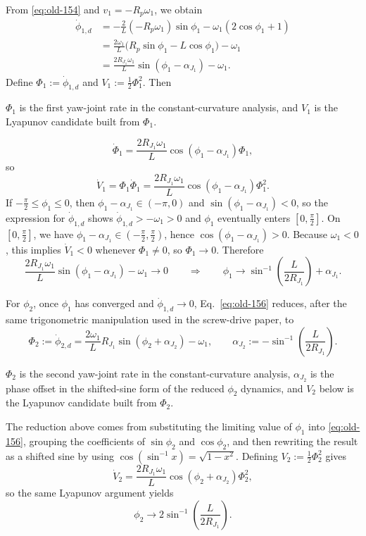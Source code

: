 \documentclass[12pt,a4paper]{report}
\newcommand{\newsymbols}[1]{\par\noindent{}#1\par\vspace{0.35em}}
\begin{document}
From \eqref{eq:old-154} and $v_1 = -R_p\omega_1$, we obtain
\begin{align}
\dot{\phi}_{1,d}
&=
-\frac{2}{L}(-R_p\omega_1)\sin\phi_1 - \omega_1(2\cos\phi_1 + 1) \\
&=
\frac{2\omega_1}{L}
\bigl(
R_p\sin\phi_1 - L\cos\phi_1
\bigr)
- \omega_1 \\
&=
\frac{2R_{J_1}\omega_1}{L}\sin(\phi_1 - \alpha_{J_1}) - \omega_1.
\end{align}
Define $\Phi_1 := \dot{\phi}_{1,d}$ and $V_1 := \frac{1}{2}\Phi_1^2$. Then
\newsymbols{$\Phi_1$ is the first yaw-joint rate in the constant-curvature analysis, and $V_1$ is the Lyapunov candidate built from $\Phi_1$.}
\begin{equation}
\dot{\Phi}_1 =
\frac{2R_{J_1}\omega_1}{L}\cos(\phi_1 - \alpha_{J_1})\Phi_1,
\end{equation}
so
\begin{equation}
\dot{V}_1
= \Phi_1 \dot{\Phi}_1
=
\frac{2R_{J_1}\omega_1}{L}
\cos(\phi_1 - \alpha_{J_1})\Phi_1^2.
\end{equation}
If $-\frac{\pi}{2} \le \phi_1 \le 0$, then $\phi_1 - \alpha_{J_1} \in (-\pi,0)$ and $\sin(\phi_1 - \alpha_{J_1}) < 0$, so the expression for $\dot{\phi}_{1,d}$ shows $\dot{\phi}_{1,d} > -\omega_1 > 0$ and $\phi_1$ eventually enters $[0,\frac{\pi}{2}]$. On $[0,\frac{\pi}{2}]$, we have $\phi_1 - \alpha_{J_1} \in (-\frac{\pi}{2},\frac{\pi}{2})$, hence $\cos(\phi_1 - \alpha_{J_1}) > 0$. Because $\omega_1 < 0$, this implies $\dot{V}_1 < 0$ whenever $\Phi_1 \neq 0$, so $\Phi_1 \to 0$. Therefore
\begin{equation}
\frac{2R_{J_1}\omega_1}{L}\sin(\phi_1 - \alpha_{J_1}) - \omega_1 \to 0
\qquad \Longrightarrow \qquad
\phi_1 \to \sin^{-1}\!\left(\frac{L}{2R_{J_1}}\right) + \alpha_{J_1}.
\end{equation}

For $\phi_2$, once $\phi_1$ has converged and $\dot{\phi}_{1,d} \to 0$, Eq.~\eqref{eq:old-156} reduces, after the same trigonometric manipulation used in the screw-drive paper, to
\begin{equation}
\Phi_2 := \dot{\phi}_{2,d}
= \frac{2\omega_1}{L}R_{J_1}\sin(\phi_2 + \alpha_{J_2}) - \omega_1,
\qquad
\alpha_{J_2} := -\sin^{-1}\!\left(\frac{L}{2R_{J_1}}\right).
\end{equation}
\newsymbols{$\Phi_2$ is the second yaw-joint rate in the constant-curvature analysis, $\alpha_{J_2}$ is the phase offset in the shifted-sine form of the reduced $\phi_2$ dynamics, and $V_2$ below is the Lyapunov candidate built from $\Phi_2$.}
The reduction above comes from substituting the limiting value of $\phi_1$ into \eqref{eq:old-156}, grouping the coefficients of $\sin\phi_2$ and $\cos\phi_2$, and then rewriting the result as a shifted sine by using $\cos(\sin^{-1}x) = \sqrt{1-x^2}$. Defining $V_2 := \frac{1}{2}\Phi_2^2$ gives
\begin{equation}
\dot{V}_2
=
\frac{2R_{J_1}\omega_1}{L}
\cos(\phi_2 + \alpha_{J_2})\Phi_2^2,
\end{equation}
so the same Lyapunov argument yields
\begin{equation}
\phi_2 \to 2\sin^{-1}\!\left(\frac{L}{2R_{J_1}}\right).
\end{equation}
\end{document}
